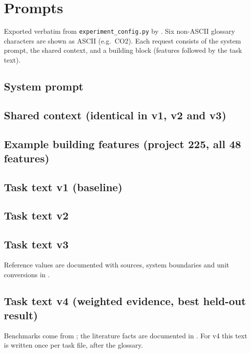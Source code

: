 \documentclass[10pt,letterpaper]{article}
\begin{document}
\onecolumn
\appendix
\section{Prompts}
\label{app:prompts}
Exported verbatim from \texttt{experiment\_config.py} by . Six non-ASCII glossary characters are shown as ASCII (e.g.\ CO2). Each request consists of the system prompt, the shared context, and a building block (features followed by the task text).

\subsection{System prompt}

\subsection{Shared context (identical in v1, v2 and v3)}

\subsection{Example building features (project 225, all 48 features)}

\subsection{Task text v1 (baseline)}

\subsection{Task text v2}

\subsection{Task text v3}
\label{app:v3}
Reference values are documented with sources, system boundaries and unit conversions in .

\subsection{Task text v4 (weighted evidence, best held-out result)}
\label{app:v4}
Benchmarks come from ; the literature facts are documented in . For v4 this text is written once per task file, after the glossary.

\end{document}
